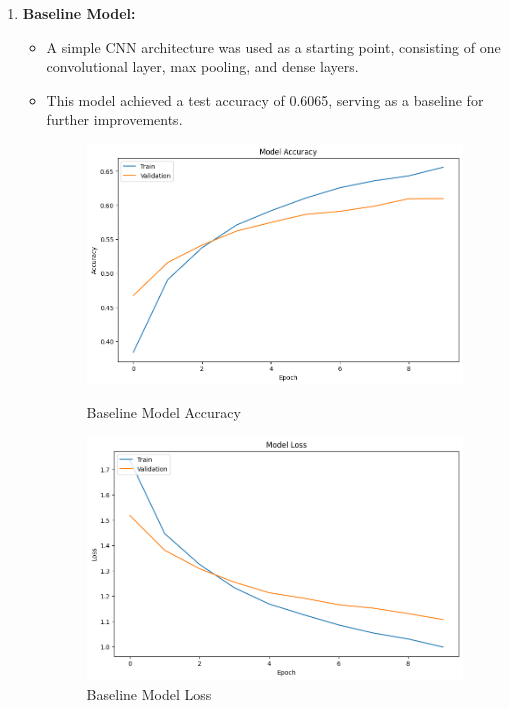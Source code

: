 \documentclass{article}
\begin{document}
\begin{enumerate}
    \item \textbf{Baseline Model:}
    \begin{itemize}
        \item A simple CNN architecture was used as a starting point, consisting of one convolutional layer, max pooling, and dense layers.
        \item This model achieved a test accuracy of 0.6065, serving as a baseline for further improvements.
    \begin{figure}[H]
        \centering
        \begin{minipage}{0.45\textwidth}
            \centering
            \includegraphics[width=\textwidth]{BaselineMA.png}
            \caption{Baseline Model Accuracy}
            \label{BMA}
        \end{minipage}
        \hfill
        \begin{minipage}{0.45\textwidth}
            \centering
            \includegraphics[width=\textwidth]{BaselineML.png}
            \caption{Baseline Model Loss}
            \label{BML}
        \end{minipage}
    \end{figure}
        

\end{itemize}
\end{enumerate}
\end{document}
